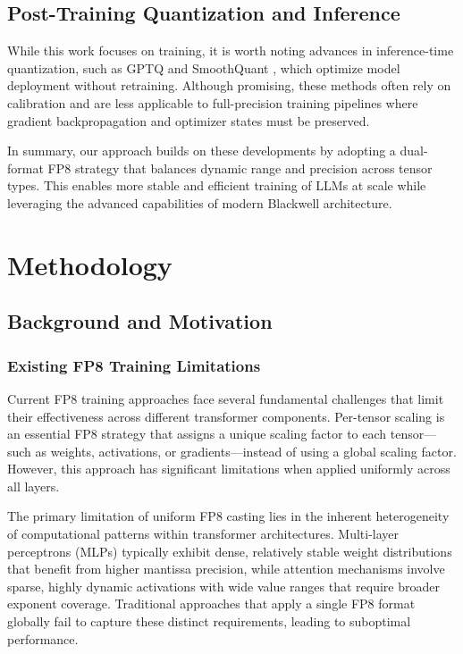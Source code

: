 \documentclass[conference]{IEEEtran}
\begin{document}
\subsection{Post-Training Quantization and Inference}
While this work focuses on training, it is worth noting advances in inference-time quantization, such as GPTQ \cite{frantar2022gptq} and SmoothQuant \cite{xiao2023smoothquant}, which optimize model deployment without retraining. Although promising, these methods often rely on calibration and are less applicable to full-precision training pipelines where gradient backpropagation and optimizer states must be preserved.

In summary, our approach builds on these developments by adopting a dual-format FP8 strategy that balances dynamic range and precision across tensor types. This enables more stable and efficient training of LLMs at scale while leveraging the advanced capabilities of modern Blackwell architecture.

\section{Methodology}
\label{sec:methodology}

\subsection{Background and Motivation}

\subsubsection{Existing FP8 Training Limitations}
Current FP8 training approaches face several fundamental challenges that limit their effectiveness across different transformer components. Per-tensor scaling is an essential FP8 strategy that assigns a unique scaling factor to each tensor—such as weights, activations, or gradients—instead of using a global scaling factor. However, this approach has significant limitations when applied uniformly across all layers.

The primary limitation of uniform FP8 casting lies in the inherent heterogeneity of computational patterns within transformer architectures. Multi-layer perceptrons (MLPs) typically exhibit dense, relatively stable weight distributions that benefit from higher mantissa precision, while attention mechanisms involve sparse, highly dynamic activations with wide value ranges that require broader exponent coverage. Traditional approaches that apply a single FP8 format globally fail to capture these distinct requirements, leading to suboptimal performance.
\end{document}

